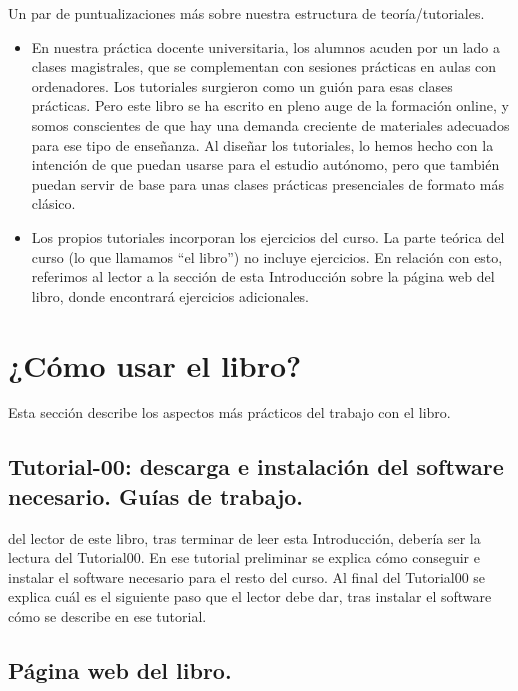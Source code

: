 Un par de puntualizaciones más sobre nuestra estructura de teoría/tutoriales.
\begin{itemize}
  \item En nuestra práctica docente universitaria, los alumnos acuden por un lado a clases magistrales, que se complementan con sesiones prácticas en aulas con ordenadores. Los tutoriales surgieron como un guión para esas clases prácticas. Pero este libro se ha escrito en pleno auge de la formación online, y somos conscientes de que hay una demanda creciente de materiales adecuados para ese tipo de enseñanza. Al diseñar los tutoriales, lo hemos hecho con la intención de que puedan usarse para el estudio autónomo, pero que también puedan servir de base para unas clases prácticas presenciales de formato más clásico.

  \item Los propios tutoriales incorporan los ejercicios del curso. La parte teórica del curso (lo que llamamos ``el libro'') no incluye ejercicios. En relación con esto, referimos al lector a la sección de esta Introducción sobre la página web del libro, donde encontrará ejercicios adicionales.
\end{itemize}


\section*{¿Cómo usar el libro?}
\label{prefacio:sec:ComoUsar}

\noindent Esta sección describe los aspectos más prácticos del trabajo con el libro.

\subsection*{Tutorial-00: descarga e instalación del software necesario. Guías de trabajo.}

 del lector de este libro, tras terminar de leer esta Introducción, debería ser la lectura del Tutorial00. En ese tutorial preliminar se explica cómo conseguir e instalar el software necesario para el resto del curso. Al final del Tutorial00 se explica cuál es el siguiente paso que el lector debe dar, tras instalar el software cómo se describe en ese tutorial.


\subsection*{Página web del libro.}
\label{prefacio:subsec:PaginaWebDelCurso}

